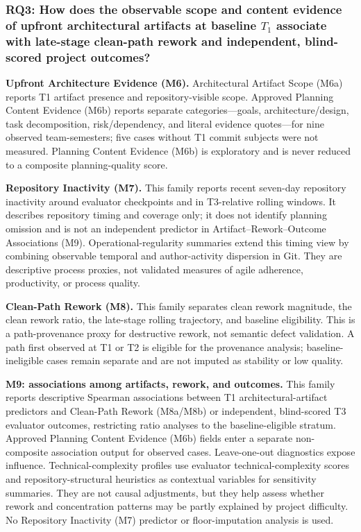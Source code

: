 \subsubsection{RQ3: How does the observable scope and content evidence of upfront architectural artifacts at baseline \texorpdfstring{$T_1$}{T1} associate with late-stage clean-path rework and independent, blind-scored project outcomes?}

\textbf{Upfront Architecture Evidence (M6).} Architectural Artifact Scope (M6a)
reports T1 artifact presence and repository-visible scope. Approved Planning
Content Evidence (M6b) reports separate categories---goals,
architecture/design, task decomposition,
risk/dependency, and literal evidence quotes---for nine observed team-semesters;
five cases without T1 commit subjects were not measured. Planning Content
Evidence (M6b) is exploratory
and is never reduced
to a composite planning-quality score.

\textbf{Repository Inactivity (M7).} This family reports recent seven-day repository
inactivity around evaluator checkpoints and in T3-relative rolling windows. It
describes repository timing and coverage only; it does not identify planning
omission and is not an independent predictor in Artifact--Rework--Outcome
Associations (M9). Operational-regularity summaries extend this timing view by
combining observable temporal and author-activity dispersion in Git. They are
descriptive process proxies, not validated measures of agile adherence,
productivity, or process quality.

\textbf{Clean-Path Rework (M8).} This family separates clean
rework magnitude, the clean rework ratio, the late-stage rolling trajectory,
and baseline eligibility. This is a path-provenance proxy for destructive
rework, not semantic defect validation. A path first observed at T1 or T2 is
eligible for the provenance
analysis; baseline-ineligible cases remain separate and are not imputed as
stability or low quality.

\textbf{M9: associations among artifacts, rework, and outcomes.} This family reports
descriptive Spearman associations between T1
architectural-artifact predictors and Clean-Path Rework (M8a/M8b) or
independent, blind-scored T3
evaluator outcomes, restricting
ratio analyses to the baseline-eligible stratum. Approved
Planning Content Evidence (M6b) fields enter a separate non-composite
association output for observed cases.
Leave-one-out diagnostics expose influence. Technical-complexity profiles use
evaluator technical-complexity scores and repository-structural heuristics as
contextual variables for sensitivity summaries. They are not causal
adjustments, but they help assess whether rework and concentration patterns may
be partly explained by project difficulty. No Repository Inactivity (M7)
predictor or floor-imputation analysis is used.

